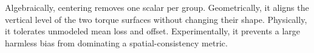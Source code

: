 Algebraically, centering removes one scalar per group. Geometrically, it aligns
the vertical level of the two torque surfaces without changing their shape.
Physically, it tolerates unmodeled mean loss and offset. Experimentally, it
prevents a large harmless bias from dominating a spatial-consistency metric.
